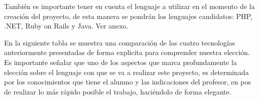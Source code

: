 \documentclass[a4paper,12pt,openany,oneside]{book}
\begin{document}
También es importante tener en cuenta el lenguaje a utilizar en el momento de la creación del proyecto, de esta manera se pondrán los lenguajes candidatos: PHP, .NET, Ruby on Rails y Java. Ver anexo.

En la siguiente tabla se muestra una comparación de las cuatro tecnologías anteriormente presentadas de forma explicita para comprender nuestra elección. Es importante señalar que uno de los aspectos que marca profundamente la elección sobre el lenguaje con que se va a realizar este proyecto, es determinada por los conocimientos que tiene el alumno y las indicaciones del profesor, en pos de realizar lo más rápido posible el trabajo, haciéndolo de forma elegante. 

\begin{table}
\begin{tabular}{| l | l | l | l | l |}
\hline

\end{tabular}
\end{table}
\end{document}
